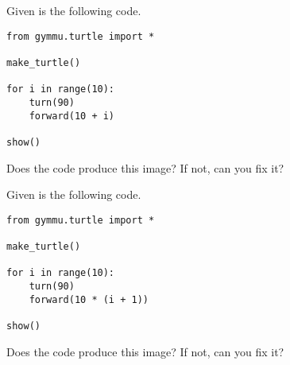 \documentclass[11pt,a4paper]{report}
\begin{document}
\begin{ex}
Given is the following code.
\begin{lstlisting}
from gymmu.turtle import *

make_turtle()

for i in range(10):
    turn(90)
    forward(10 + i)

show()
\end{lstlisting}
Does the code produce this image? If not, can you fix it?
\end{ex}


\begin{ex}
Given is the following code.
\begin{lstlisting}
from gymmu.turtle import *

make_turtle()

for i in range(10):
    turn(90)
    forward(10 * (i + 1))

show()
\end{lstlisting}
Does the code produce this image? If not, can you fix it?
\end{ex}
\end{document}
